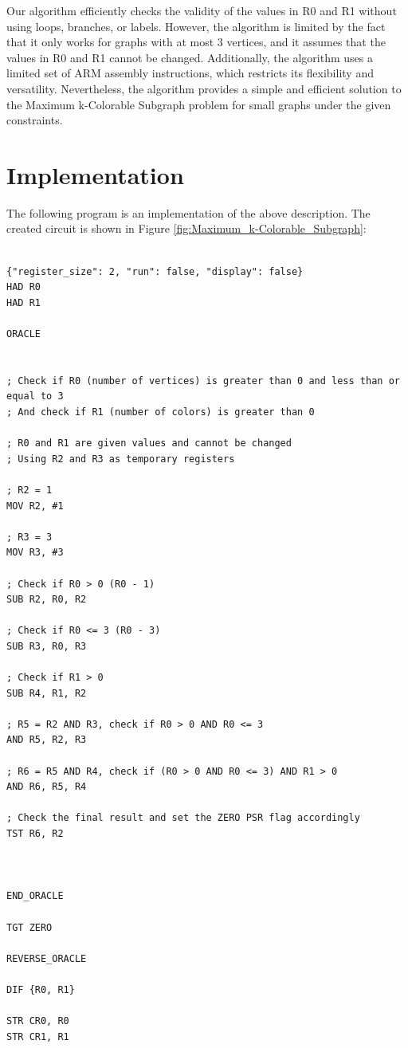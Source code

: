 Our algorithm efficiently checks the validity of the values in R0 and R1 without using loops, branches, or labels. However, the algorithm is limited by the fact that it only works for graphs with at most 3 vertices, and it assumes that the values in R0 and R1 cannot be changed. Additionally, the algorithm uses a limited set of ARM assembly instructions, which restricts its flexibility and versatility. Nevertheless, the algorithm provides a simple and efficient solution to the Maximum k-Colorable Subgraph problem for small graphs under the given constraints.



\section{Implementation}

The following program is an implementation of the above description. The created circuit is shown in Figure \ref{fig:Maximum_k-Colorable_Subgraph}:

\begin{lstlisting}

{"register_size": 2, "run": false, "display": false}
HAD R0
HAD R1

ORACLE


; Check if R0 (number of vertices) is greater than 0 and less than or equal to 3
; And check if R1 (number of colors) is greater than 0

; R0 and R1 are given values and cannot be changed
; Using R2 and R3 as temporary registers

; R2 = 1
MOV R2, #1

; R3 = 3
MOV R3, #3

; Check if R0 > 0 (R0 - 1)
SUB R2, R0, R2

; Check if R0 <= 3 (R0 - 3)
SUB R3, R0, R3

; Check if R1 > 0
SUB R4, R1, R2

; R5 = R2 AND R3, check if R0 > 0 AND R0 <= 3
AND R5, R2, R3

; R6 = R5 AND R4, check if (R0 > 0 AND R0 <= 3) AND R1 > 0
AND R6, R5, R4

; Check the final result and set the ZERO PSR flag accordingly
TST R6, R2



END_ORACLE

TGT ZERO

REVERSE_ORACLE

DIF {R0, R1}

STR CR0, R0
STR CR1, R1


\end{lstlisting}

